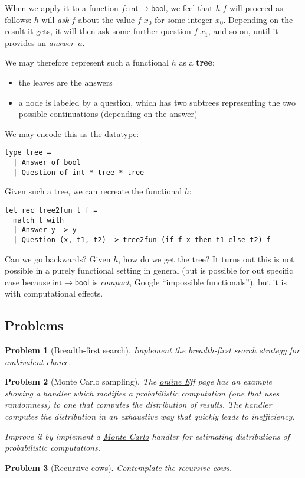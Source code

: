 \documentclass{article}
\newtheorem{problem}{Problem}[section]}
\begin{document}
When we apply it to a function $f : \mathsf{int} \to \mathsf{bool}$, we feel
that $h \; f$ will proceed as follows: $h$ will \emph{ask} $f$ about the value
$f \; x_0$ for some integer $x_0$. Depending on the result it gets, it will then
ask some further question $f \; x_1$, and so on, until it provides an
\emph{answer}~$a$.

We may therefore represent such a functional $h$ as a \textbf{tree}:
%
\begin{itemize}
\item
  the leaves are the answers
\item
  a node is labeled by a question, which has two subtrees representing
  the two possible continuations (depending on the answer)
\end{itemize}
%
We may encode this as the datatype:
%
\begin{verbatim}
type tree =
  | Answer of bool
  | Question of int * tree * tree
\end{verbatim}
%
Given such a tree, we can recreate the functional $h$:
%
\begin{verbatim}
let rec tree2fun t f =
  match t with
  | Answer y -> y
  | Question (x, t1, t2) -> tree2fun (if f x then t1 else t2) f
\end{verbatim}
%
Can we go backwards? Given $h$, how do we get the tree? It turns out this is not
possible in a purely functional setting in general (but is possible for out
specific case because $\mathsf{int} \to \mathsf{bool}$ is \emph{compact},
Google ``impossible functionals''), but it is with computational effects. 



\hypertarget{problems-1}{%
\subsection{Problems}\label{problems-1}}

\begin{problem}[Breadth-first search]
  Implement the \emph{breadth-first search} strategy for ambivalent choice.
\end{problem}

\begin{problem}[Monte Carlo sampling]
%
The \href{http://www.eff-lang.org/try/}{online Eff} page has an example
showing a handler which modifies a probabilistic computation (one that
uses randomness) to one that computes the \emph{distribution} of
results. The handler computes the distribution in an exhaustive way that
quickly leads to inefficiency.

Improve it by implement a
\href{https://en.wikipedia.org/wiki/Monte_Carlo_method}{Monte Carlo}
handler for estimating distributions of probabilistic computations.
\end{problem}

\begin{problem}[Recursive cows]
  Contemplate the
  \href{https://github.com/effect-handlers/effects-rosetta-stone/tree/master/examples/recursive-cow}{recursive
    cows}.
\end{problem}
\end{document}
